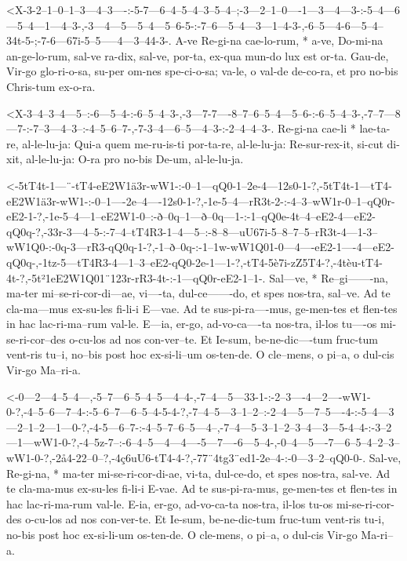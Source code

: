 
  {<X-3-2--1--0--1--3---4--3----:-5-7---6--4--5--4--3--5--4--;-3---2--1--0----1---3---4---3-:-5--4---6---5--4---1---4--3-,-3---4---5---5--4---5--6-5-:-7--6---5--4---3---1--4-3-,-6--5---4-6---5--4--34t-5-;-7-6---67i-5--5-----4---3--44-3-.}
  {   A-ve Re-gi-na cae-lo-rum, * a-ve, Do-mi-na an-ge-lo-rum, sal-ve ra-dix, sal-ve, por-ta, ex-qua mun-do lux est or-ta. Gau-de, Vir-go glo-ri-o-sa, su-per om-nes spe-ci-o-sa; va-le, o val-de de-co-ra, et pro no-bis Chris-tum ex-o-ra.}


  {<X-3--4--3--4---5--:-6---5--4-:-6--5--4--3-,-3---7-7----8--7--6--5--4---5--6-:-6--5--4--3-,-7--7---8---7-:-7--3---4--3--:-4--5--6--7-,-7-3--4---6--5---4--3-:-2--4--4--3-.}
  {   Re-gi-na cae-li * lae-ta-re, al-le-lu-ja: Qui-a quem me-ru-is-ti por-ta-re, al-le-lu-ja: Re-sur-rex-it, si-cut di-xit, al-le-lu-ja: O-ra pro no-bis De-um, al-le-lu-ja.}

  {<-5tT4t-1---¨-tT4-eE2W1ä3r-wW1-:-0--1---qQ0-1--2e-4---12s0-1-?,-5tT4t-1---tT4-eE2W1ä3r-wW1-:-0--1----2e--4----12s0-1-?,-1e-5--4---rR3t-2-:-4--3--wW1r-0--1--qQ0r-eE2-1-?,-1e-5--4---1--eE2W1-0--:-ð--0q--1---ð--0q---1-:-1--qQ0e-4t--4--eE2-4---eE2-qQ0q-?,-33r-3---4--5-:-7--4--tT4R3-1--4---5--:-8--8---uU67i-5--8--7--5--rR3t-4---1-3--wW1Q0-:-0q-3---rR3-qQ0q-1-?,-1--ð--0q-:-1--1w-wW1Q01-0---4----eE2-1----4---eE2-qQ0q-,-1tz-5---tT4R3-4---1--3--eE2-qQ0-2e-1---1-?,-tT4-5è7i-zZ5T4-?,-4tèu-tT4-4t-?,-5t²1eE2W1Q01¨123r-rR3-4t-:-1---qQ0r-eE2-1--1-.}
  {  Sal---ve, * Re--gi-------na,   ma-ter mi--se-ri-cor-di---ae,  vi----ta, dul-ce-------do,   et spes nos-tra, sal--ve.  Ad te cla-ma---mus ex-su-les  fi-li-i    E---vae. Ad te sus-pi-ra----mus, ge-men-tes et flen-tes in hac  lac-ri-ma--rum val-le.     E---ia, er-go, ad-vo-ca----ta nos-tra, il-los tu----os mi-se-ri-cor--des o-cu-los     ad nos con-ver--te.  Et Ie-sum, be-ne-dic----tum fruc-tum vent-ris tu--i,     no--bis post  hoc ex-si-li--um  os-ten-de.  O   cle--mens,    o    pi--a,    o                 dul-cis  Vir-go   Ma--ri-a.}

  {<-0---2---4--5--4---,-5--7---6--5--4--5---4--4-,-7--4---5---33-1-:-2--3----4---2----wW1-0-?,-4--5--6---7--4-:-5--6--7---6--5--4-5-4-?,-7--4--5---3--1--2--:-2--4---5---7--5----4-:-5--4---3---2--1--2---1---0-?,-4-5---6--7-:-4--5--7--6--5---4--,-7--4---5--3--1--2--3--4---3---5-4--4-:-3--2---1---wW1-0-?,-4--5z-7--:-6--4--5---4---4----5---7----6---5--4-,-0--4---5----7---6--5--4--2--3--wW1-0-?,-2å4-22--0--?,-4ç6uU6-tT4-4-?,-77¨4tg3¨ed1-2e--4-:-0---3--2--qQ0-0-.}
  {  Sal-ve, Re-gi-na, * ma-ter mi-se-ri-cor-di-ae, vi-ta, dul-ce-do, et spes nos-tra, sal-ve.  Ad te cla-ma-mus ex-su-les fi-li-i E-vae. Ad te sus-pi-ra-mus, ge-men-tes et flen-tes in hac lac-ri-ma-rum val-le.  E-ia, er-go, ad-vo-ca-ta nos-tra, il-los tu-os mi-se-ri-cor-des o-cu-los ad nos con-ver-te.  Et Ie-sum, be-ne-dic-tum fruc-tum vent-ris tu-i,  no-bis post hoc ex-si-li-um os-ten-de.  O   cle-mens, o      pi--a,   o           dul-cis Vir-go Ma-ri--a.}

